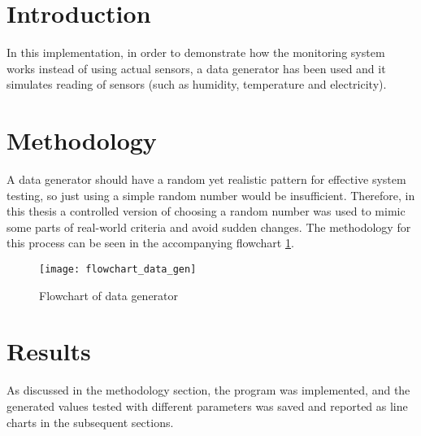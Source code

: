\section{Introduction}
    In this implementation, in order to demonstrate how the monitoring system works instead of using actual sensors, a data generator has been used and it simulates reading of sensors (such as humidity, temperature and electricity).

\section{Methodology}
A data generator should have a random yet realistic pattern for effective system testing, so just using a simple random number would be insufficient. Therefore, in this thesis a controlled version of choosing a random number was used to mimic some parts of real-world criteria and avoid sudden changes. The methodology for this process can be seen in the accompanying flowchart \ref{chart:data_gen}.\\


    \begin{figure}
        \centering
        \captionsetup{type=figure}
        \texttt{[image: flowchart\_data\_gen]}
        \caption{Flowchart of data generator}
        \label{chart:data_gen}
    \end{figure}

\section{Results}
    As discussed in the methodology section, the program was implemented, and the generated values tested with different parameters was saved and reported as line charts in the subsequent sections.
